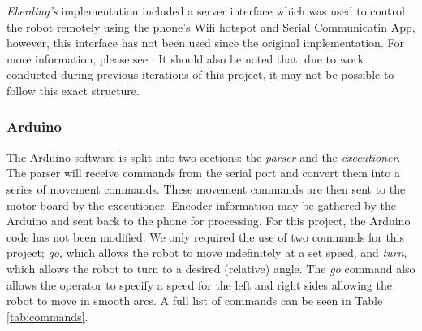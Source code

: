 \documentclass[a4paper,12pt,twoside,openright]{article}
\begin{document}
\textit{Eberding's} implementation included a server interface which was used to control the robot
remotely
using the phone's Wifi hotspot and Serial Communicatin App, however, this interface has not been used
since the original implementation. For more information, please see \cite{Eberding2016}. It should
also be noted that, due to work conducted during previous iterations of this project, it may not
be possible to follow this exact structure.


\subsubsection{Arduino}
The Arduino software is split into two sections: the \textit{parser} and the \textit{executioner}\cite{Eberding2016}.
The parser will receive commands from the serial port and convert them into a series of movement
commands. These movement commands are then sent to the motor board by the executioner. Encoder
information may be gathered by the Arduino and sent back to the phone for processing.
For this project,
the Arduino code has not been modified. We only required the use of two commands for this project;
\textit{go}, which allows the robot to move indefinitely at a set speed, and \textit{turn}, which
allows the robot to turn to a desired (relative) angle. The \textit{go} command also allows the
operator to specify a speed for the left and right sides allowing the robot to move in smooth arcs.
A full list of commands can be seen in Table \ref{tab:commands}.
\end{document}
